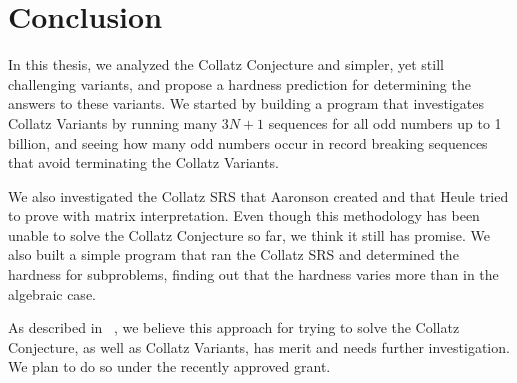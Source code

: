 \chapter{Conclusion} \label{sec:conclusion}
In this thesis, we analyzed the Collatz Conjecture and simpler, yet still challenging variants, and propose a hardness prediction for determining the answers to these variants. We started by building a program that investigates Collatz Variants by running many $3N+1$ sequences for all odd numbers up to 1 billion, and seeing how many odd numbers occur in record breaking sequences that avoid terminating the Collatz Variants. \par
We also investigated the Collatz SRS that Aaronson created and that Heule tried to prove with matrix interpretation. Even though this methodology has been unable to solve the Collatz Conjecture so far, we think it still has promise. We also built a simple program that ran the Collatz SRS and determined the hardness for subproblems, finding out that the hardness varies more than in the algebraic case.\par
As described in ~\cite{HeuleAaronson}, we believe this approach for trying to solve the Collatz Conjecture, as well as Collatz Variants, has merit and needs further investigation. We plan to do so under the recently approved grant.